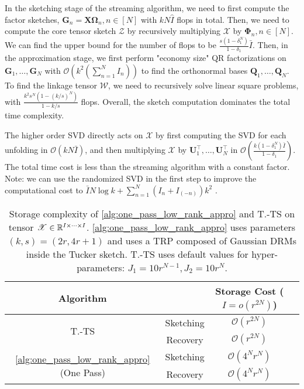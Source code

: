 In the sketching stage of the streaming algorithm, we need to first compute the factor sketches, $\mathbf{G}_n = \mathbf{X}\mathbf{\Omega}_n, n \in [N]$ with $kN\hat{I}$ flops in total. Then, we need to compute the core tensor sketch $\mathscr{Z}$ by recursively multiplying $\mathscr{X}$ by $\mathbf{\Phi}_n, n \in [N]$. We can find the upper bound for the number of flops to be $\frac{s(1-\delta_1^N)}{1-\delta_1}\bar{I}$. Then, in the approximation stage, we first perform "economy size" QR factorizations on $\mathbf{G}_1, \dots, \mathbf{G}_N$ with $\mathscr{O}(k^2(\sum_{n =1}^N I_n))$ to find the orthonormal bases $\mathbf{Q}_1, \dots, \mathbf{Q}_N$. To find the linkage tensor $\mathscr{W}$, we need to recursively solve linear square problems, with $\frac{k^2s^N(1-(k/s)^N)}{1-k/s}$ flops. Overall, the sketch computation dominates the total time complexity.

The higher order SVD directly acts on $\mathscr{X}$ by first computing the SVD for each unfolding in $\mathscr{O}(kN\bar{I})$, and then multiplying $\mathscr{X}$ by $\mathbf{U}_1^\top, \dots, \mathbf{U}_N^\top$ in $\mathcal{O}(\frac{k(1-\delta_1^N)\bar{I}}{1-\delta_1})$. The total time cost is less than the streaming algorithm with a constant factor. Note: we can use the randomized SVD in the first step to improve the computational cost to $\bar{I}N\log k + \sum_{n = 1}^N(I_{n}+I_{(-n)})k^2$ \cite{halko2011finding}.

\begin{table}[h!]
	\centering
	\begin{tabular}{c c c c }
		Algorithm  & & Storage Cost ($I=o(r^{2N})$) \\
		\hline

		\multirow{2}{*}{T.-TS} & Sketching & $\mathcal{O}(r^{2N})$ \\
		& Recovery &  $\mathcal{O}(r^{2N})$ & \\
		\hline\hline
		\multirow{2}{*}{\cref{alg:one_pass_low_rank_appro} (One Pass)} & Sketching &  $\mathcal{O}(4^Nr^N)$  \\
		& Recovery  & $\mathcal{O}(4^Nr^N)$  \\
		\hline
	\end{tabular}
	\caption{Storage complexity of \cref{alg:one_pass_low_rank_appro} and T.-TS
	on tensor $\T{X} \in \mathbb{R}^{I \times \dots \times I}$.
	\cref{alg:one_pass_low_rank_appro} uses parameters $(k,s) = (2r, 4r+1)$
	and uses a TRP composed of Gaussian DRMs inside the Tucker sketch.
	T.-TS uses default values for hyper-parameters: $J_1=10r^{N-1}, J_2=10r^{N}$.}
	\label{tab:storage-comparison}
\end{table}


